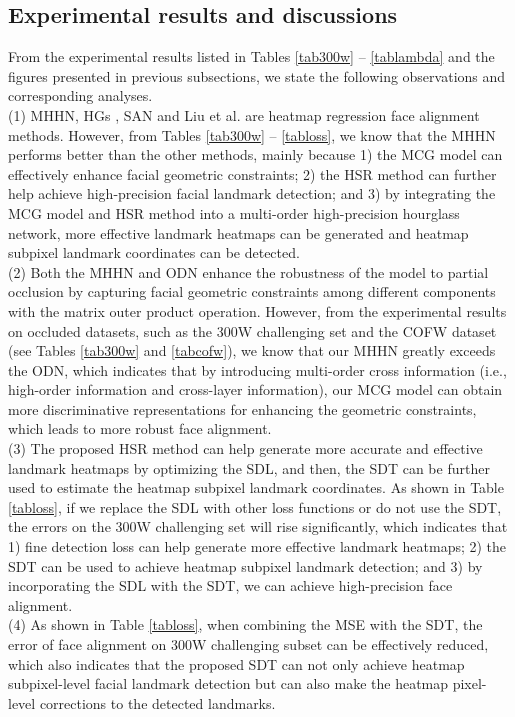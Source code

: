 \documentclass[journal]{IEEEtran}
\begin{document}
\subsection{Experimental results and discussions}
From the experimental results listed in Tables \ref{tab300w} -- \ref{tablambda} and the figures presented in previous subsections, we state the following observations and corresponding analyses.
\\\indent (1) MHHN, HGs \cite{Yang2017StackedHN}, SAN \cite{Dong2018StyleAN} and Liu et al. \cite{Liu2019SemanticAF} are heatmap regression face alignment methods. However, from Tables \ref{tab300w} -- \ref{tabloss}, we know that the MHHN performs better than the other methods, mainly because 1) the MCG model can effectively enhance facial geometric constraints; 2) the HSR method can further help achieve high-precision facial landmark detection; and 3) by integrating the MCG model and HSR method into a multi-order high-precision hourglass network, more effective landmark heatmaps can be generated and heatmap subpixel landmark coordinates can be detected.
\\\indent (2) Both the MHHN and ODN \cite{Zhu2019RobustFL} enhance the robustness of the model to partial occlusion by capturing facial geometric constraints among different components with the matrix outer product operation. However, from the experimental results on occluded datasets, such as the 300W challenging set and the COFW dataset (see Tables \ref{tab300w} and \ref{tabcofw}), we know that our MHHN greatly exceeds the ODN, which indicates that by introducing multi-order cross information (i.e., high-order information and cross-layer information), our MCG model can obtain more discriminative representations for enhancing the geometric constraints, which leads to more robust face alignment. 
\\\indent (3) The proposed HSR method can help generate more accurate and effective landmark heatmaps by optimizing the SDL, and then, the SDT can be further used to estimate the heatmap subpixel landmark coordinates. As shown in Table \ref{tabloss}, if we replace the SDL with other loss functions or do not use the SDT, the errors on the 300W challenging set will rise significantly, which indicates that 1) fine detection loss can help generate more effective landmark heatmaps; 2) the SDT can be used to achieve heatmap subpixel landmark detection; and 3) by incorporating the SDL with the SDT, we can achieve high-precision face alignment.
\\\indent (4) As shown in Table \ref{tabloss}, when combining the MSE with the SDT, the error of face alignment on 300W challenging subset can be effectively reduced, which also indicates that the proposed SDT can not only achieve heatmap subpixel-level facial landmark detection but can also make the heatmap pixel-level corrections to the detected landmarks.
\end{document}
